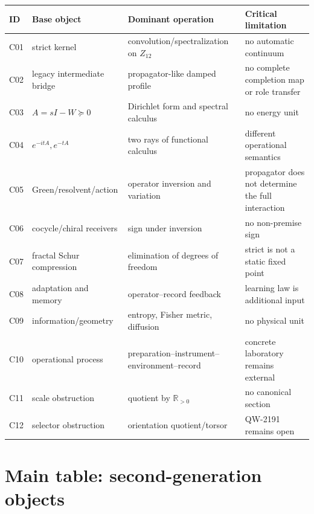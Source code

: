 \documentclass[11pt,a4paper,openany]{report}
\begin{document}
\begin{center}
\begingroup\small
\setlength{\tabcolsep}{2.5pt}
\renewcommand{\arraystretch}{1.16}
\begin{longtable}{@{}p{}p{}p{}p{}@{}}
\toprule
\textbf{ID} & \textbf{Base object} & \textbf{Dominant operation} & \textbf{Critical limitation} \\
\midrule
\endhead
C01 & strict kernel & convolution/\allowbreak{}spectralization on \(Z_{12}\) & no automatic continuum \\
C02 & legacy intermediate bridge & propagator-like damped profile & no complete completion map or role transfer \\
C03 & \(A=sI-W\succeq0\) & Dirichlet form and spectral calculus & no energy unit \\
C04 & \(e^{-itA},e^{-tA}\) & two rays of functional calculus & different operational semantics \\
C05 & Green/\allowbreak{}resolvent/\allowbreak{}action & operator inversion and variation & propagator does not determine the full interaction \\
C06 & cocycle/\allowbreak{}chiral receivers & sign under inversion & no non-premise sign \\
C07 & fractal Schur compression & elimination of degrees of freedom & strict is not a static fixed point \\
C08 & adaptation and memory & operator--record feedback & learning law is additional input \\
C09 & information/\allowbreak{}geometry & entropy, Fisher metric, diffusion & no physical unit \\
C10 & operational process & preparation--instrument--environment--record & concrete laboratory remains external \\
C11 & scale obstruction & quotient by \(\mathbb R_{>0}\) & no canonical section \\
C12 & selector obstruction & orientation quotient/\allowbreak{}torsor & QW-2191 remains open \\
\bottomrule
\end{longtable}
\endgroup
\end{center}

\chapter{Main table: second-generation objects}
\end{document}
